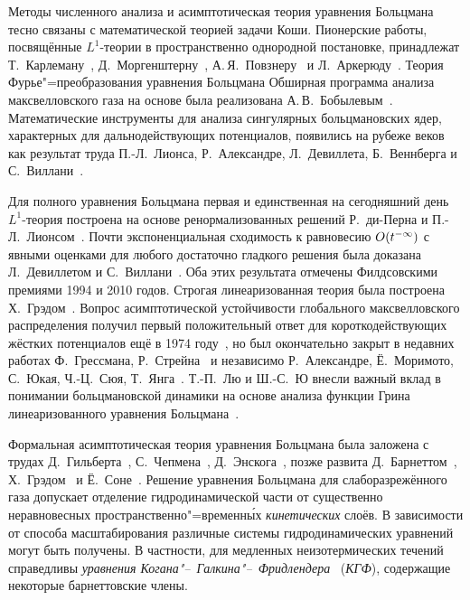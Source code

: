 {\progress}

Методы численного анализа и асимптотическая теория уравнения Больцмана тесно связаны
с математической теорией задачи Коши.
Пионерские работы, посвящённые \(L^1\)-теории в пространственно однородной постановке,
принадлежат Т.~Карлеману~\autocite{Carleman1933}, Д.~Моргенштерну~\autocite{Morgenstern1954},
А.\,Я.~Повзнеру~\autocite{Povzner1962} и Л.~Аркерюду~\autocite{Arkeryd1972}.
Теория Фурье"=преобразования уравнения Больцмана Обширная программа анализа максвелловского газа на основе
была реализована А.\,В.~Бобылевым~\autocite{Bobylev1984}.
Математические инструменты для анализа сингулярных больцмановских ядер,
характерных для дальнодействующих потенциалов, появились на рубеже веков как результат труда
П.-Л.~Лионса, Р.~Александре, Л.~Девиллета, Б.~Веннберга и С.~Виллани~\autocite{Lions1989, Alexandre2000}.

Для полного уравнения Больцмана первая и единственная на сегодняшний день \(L^1\)-теория
построена на основе ренормализованных решений Р.~ди-Перна и П.-Л.~Лионсом~\autocite{Lions1989}.
Почти экспоненциальная сходимость к равновесию \(O(t^{-\infty})\) с явными оценками
для любого достаточно гладкого решения была доказана Л.~Девиллетом и С.~Виллани~\autocite{Villani2005}.
Оба этих результата отмечены Филдсовскими премиями 1994 и 2010 годов.
Строгая линеаризованная теория была построена Х.~Грэдом~\autocite{Grad1963b}.
Вопрос асимптотической устойчивости глобального максвелловского распределения
получил первый положительный ответ для короткодействующих жёстких потенциалов ещё в 1974 году~\autocite{Ukai1974},
но был окончательно закрыт в недавних работах Ф.~Грессмана, Р.~Стрейна~\autocite{Strain2011} и независимо
Р.~Александре, Ё.~Моримото, С.~Юкая, Ч.-Ц.~Сюя, Т.~Янга~\autocite{Alexandre2012soft}.
Т.-П.~Лю и Ш.-С.~Ю внесли важный вклад в понимании больцмановской динамики
на основе анализа функции Грина линеаризованного уравнения Больцмана~\autocite{Liu2004green, Liu2006}.

Формальная асимптотическая теория уравнения Больцмана была заложена с трудах Д.~Гильберта~\autocite{Hilbert1912},
С.~Чепмена~\autocite{Chapman1916}, Д.~Энскога~\autocite{Enskog1917},
позже развита Д.~Барнеттом~\autocite{Burnett1935}, Х.~Грэдом~\autocite{Grad1963a} и Ё.~Соне~\autocite{Sone2002}.
Решение уравнения Больцмана для слаборазрежённого газа допускает отделение гидродинамической части
от существенно неравновесных пространственно"=временн\'{ы}х \emph{кинетических} слоёв.
В зависимости от способа масштабирования различные системы гидродинамических уравнений могут быть получены.
В частности, для медленных неизотермических течений справедливы
\emph{уравнения Когана"--~Галкина"--~Фридлендера}~\autocite{Kogan1976} (\emph{КГФ}),
содержащие некоторые барнеттовские члены.

